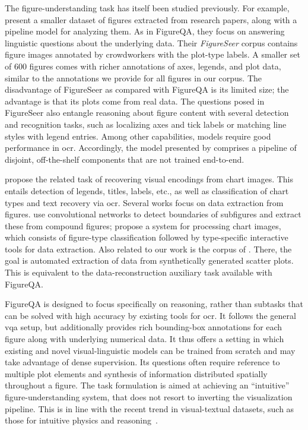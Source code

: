 \documentclass{article} \usepackage{iclr2018_workshop,times}
\begin{document}
The figure-understanding task has itself been studied previously.
For example, \citet{siegel2016figureseer} present a smaller dataset of figures extracted from research papers, along with a pipeline model for analyzing them.
As in FigureQA, they focus on answering linguistic questions about the underlying data. 
Their \emph{FigureSeer} corpus contains  figure images annotated by crowdworkers with the plot-type labels.
A smaller set of 600 figures comes with richer annotations of axes, legends, and plot data, similar to the annotations we provide for all  figures in our corpus.
The disadvantage of FigureSeer as compared with FigureQA is its limited size; the advantage is that its plots come from real data.
The questions posed in FigureSeer also entangle reasoning about figure content with several detection and recognition tasks, such as localizing axes and tick labels or matching line styles with legend entries. Among other capabilities, models require good performance in \gls{ocr}.
Accordingly, the model presented by \citet{siegel2016figureseer} comprises a pipeline of disjoint, off-the-shelf components that are not trained end-to-end.

\citet{poco2017reverse} propose the related task of recovering visual encodings from chart images. This entails detection of legends, titles, labels, etc., as well as classification of chart types and text recovery via \gls{ocr}.
Several works focus on data extraction from figures.
\citet{tsutsui2017data} use convolutional networks to detect boundaries of subfigures and extract these from compound figures;
\citet{jung2017chartsense} propose a system for processing chart images, which consists of figure-type classification followed by type-specific interactive tools for data extraction.
Also related to our work is the corpus of \citet{cliche2017scatteract}.
There, the goal is automated extraction of data from synthetically generated scatter plots. This is equivalent to the data-reconstruction auxiliary task available with FigureQA.

FigureQA is designed to focus specifically on reasoning, rather than subtasks that can be solved with high accuracy by existing tools for \gls{ocr}.
It follows the general \gls{vqa} setup, but additionally provides rich 
bounding-box annotations for each figure along with underlying numerical data.
It thus offers a setting in which existing and novel visual-linguistic models can be trained from scratch 
and may take advantage of dense supervision.
Its questions often require reference to multiple plot elements and synthesis of information distributed spatially throughout a figure.
The task formulation is aimed at achieving an ``intuitive'' figure-understanding system, that does not resort to inverting the visualization pipeline. This is in line with the recent trend in visual-textual datasets, such as those for intuitive physics and reasoning~\citep{goyal2017something,mun2016marioqa}.
\end{document}

